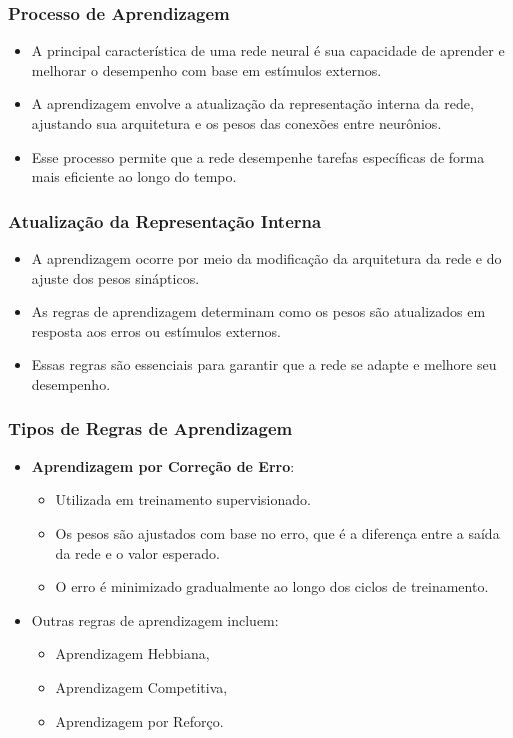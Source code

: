 \documentclass[aspectratio=169]{beamer}
\begin{document}
\begin{frame}
\frametitle{Processo de Aprendizagem}
\begin{itemize}
    \item A principal característica de uma rede neural é sua capacidade de aprender e melhorar o desempenho com base em estímulos externos.
    \item A aprendizagem envolve a atualização da representação interna da rede, ajustando sua arquitetura e os pesos das conexões entre neurônios.
    \item Esse processo permite que a rede desempenhe tarefas específicas de forma mais eficiente ao longo do tempo.
\end{itemize}
\end{frame}

\begin{frame}
\frametitle{Atualização da Representação Interna}
\begin{itemize}
    \item A aprendizagem ocorre por meio da modificação da arquitetura da rede e do ajuste dos pesos sinápticos.
    \item As regras de aprendizagem determinam como os pesos são atualizados em resposta aos erros ou estímulos externos.
    \item Essas regras são essenciais para garantir que a rede se adapte e melhore seu desempenho.
\end{itemize}
\end{frame}

\begin{frame}
\frametitle{Tipos de Regras de Aprendizagem}
\begin{itemize}
    \item \textbf{Aprendizagem por Correção de Erro}:
    \begin{itemize}
        \item Utilizada em treinamento supervisionado.
        \item Os pesos são ajustados com base no erro, que é a diferença entre a saída da rede e o valor esperado.
        \item O erro é minimizado gradualmente ao longo dos ciclos de treinamento.
    \end{itemize}
    \item Outras regras de aprendizagem incluem:
    \begin{itemize}
        \item Aprendizagem Hebbiana,
        \item Aprendizagem Competitiva,
        \item Aprendizagem por Reforço.
    \end{itemize}
\end{itemize}
\end{frame}
\end{document}
